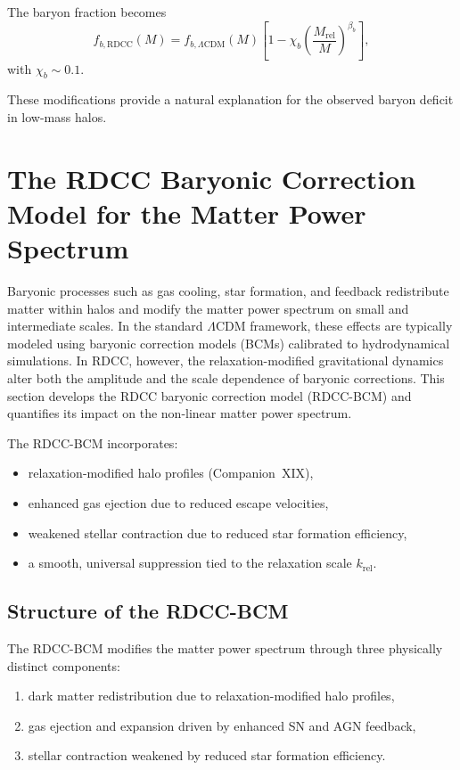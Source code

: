 \documentclass[11pt,a4paper]{article}
\begin{document}
The baryon fraction becomes
\begin{equation}
f_{b,\mathrm{RDCC}}(M)
=
f_{b,\Lambda\mathrm{CDM}}(M)
\left[
1
-
\chi_{b}
\left(
\frac{M_{\mathrm{rel}}}{M}
\right)^{\beta_{b}}
\right],
\end{equation}
with $\chi_{b} \sim 0.1$.

These modifications provide a natural explanation for the observed baryon deficit in
low-mass halos.

\section{The RDCC Baryonic Correction Model for the Matter Power Spectrum}

Baryonic processes such as gas cooling, star formation, and feedback redistribute matter
within halos and modify the matter power spectrum on small and intermediate scales. In the
standard $\Lambda$CDM framework, these effects are typically modeled using baryonic
correction models (BCMs) calibrated to hydrodynamical simulations. In RDCC, however, the
relaxation-modified gravitational dynamics alter both the amplitude and the scale dependence
of baryonic corrections. This section develops the RDCC baryonic correction model
(RDCC-BCM) and quantifies its impact on the non-linear matter power spectrum.

The RDCC-BCM incorporates:
\begin{itemize}
\item relaxation-modified halo profiles (Companion~XIX),
\item enhanced gas ejection due to reduced escape velocities,
\item weakened stellar contraction due to reduced star formation efficiency,
\item a smooth, universal suppression tied to the relaxation scale $k_{\mathrm{rel}}$.
\end{itemize}

\subsection{Structure of the RDCC-BCM}

The RDCC-BCM modifies the matter power spectrum through three physically distinct
components:
\begin{enumerate}
\item dark matter redistribution due to relaxation-modified halo profiles,
\item gas ejection and expansion driven by enhanced SN and AGN feedback,
\item stellar contraction weakened by reduced star formation efficiency.
\end{enumerate}
\end{document}
